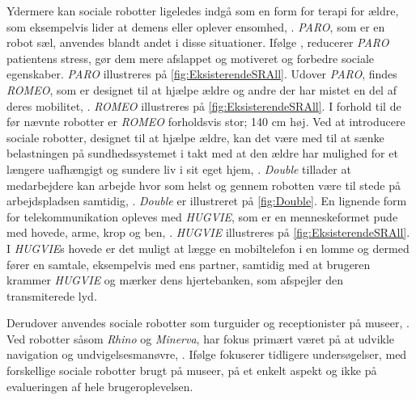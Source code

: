 Ydermere kan sociale robotter ligeledes indgå som en form for terapi for ældre, som eksempelvis lider at demens eller oplever ensomhed, \parencite[s. 110]{PDF:TheMobilePhoneAnEmontionalisedSR}. \textit{PARO}, som er en robot sæl, anvendes blandt andet i disse situationer. Ifølge \textcite{WEB:PARO}, reducerer \textit{PARO} patientens stress, gør dem mere afslappet og motiveret og forbedre sociale egenskaber. \textit{PARO} illustreres på \autoref{fig:EksisterendeSRAll}. Udover \textit{PARO}, findes \textit{ROMEO}, som er designet til at hjælpe ældre og andre der har mistet en del af deres mobilitet, \parencite{WEB:ROMEO}. \textit{ROMEO} illustreres på \autoref{fig:EksisterendeSRAll}. I forhold til de før nævnte robotter er \textit{ROMEO} forholdsvis stor; 140 cm høj. Ved at introducere sociale robotter, designet til at hjælpe ældre, kan det være med til at sænke belastningen på sundhedssystemet i takt med at den ældre har mulighed for et længere uafhængigt og sundere liv i sit eget hjem, \parencite[s. 1]{PDF:SharingALifeHarvey}.\blankline
% 
\textit{Double} tillader at medarbejdere kan arbejde hvor som helst og gennem robotten være til stede på arbejdspladsen samtidig, \parencite{WEB:Double}. \textit{Double} er illustreret på \autoref{fig:Double}. En lignende form for telekommunikation opleves med \textit{HUGVIE}, som er en menneskeformet pude med hovede, arme, krop og ben, \parencite[s. 78]{PDF:MinimizingTheHuman}. \textit{HUGVIE} illustreres på \autoref{fig:EksisterendeSRAll}. I \textit{HUGVIE}s hovede er det muligt at lægge en mobiltelefon i en lomme og dermed fører en samtale, eksempelvis med ens partner, samtidig med at brugeren krammer \textit{HUGVIE} og mærker dens hjertebanken, som afspejler den transmiterede lyd.

Derudover anvendes sociale robotter som turguider og receptionister på museer, \parencite[s. 22]{PDF:CloseButNotStuck}. Ved robotter såsom \textit{Rhino} og \textit{Minerva}, har fokus primært været på at udvikle navigation og undvigelsesmanøvre, \parencite[s. 318]{PDF:VisitingCulturalHeritage}. Ifølge \textcite[ss. 318-319]{PDF:VisitingCulturalHeritage} fokuserer tidligere undersøgelser, med forskellige sociale robotter brugt på museer, på et enkelt aspekt og ikke på evalueringen af hele brugeroplevelsen.     

